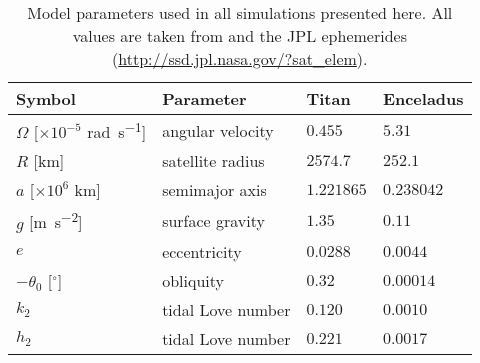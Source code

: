 \begin{table}[!t]
\scriptsize
\centering
\begin{tabularx}{0.51\linewidth}{p{1.8cm} p{2cm} p{1cm} p{1.2cm}}
 \toprule
Symbol & Parameter & Titan & Enceladus\\
 \midrule \midrule
$\Omega$ [$\times 10^{-5}$ \si{\radian\per\second}]	& angular velocity 		& $0.455$ & $5.31 $ \\
$R$ [\si{\kilo\metre}]				& satellite radius 		& $2574.7$ & $252.1$\\
$a$ [$\times 10^6$ \si{\kilo\metre}]				& semimajor axis 		& $1.221865$ & $0.238042$\\
$g$ [\si{\metre\per\second\squared}]		& surface gravity 		& $1.35$ & $0.11$\\
$e$ 								& eccentricity 			& $0.0288$ & $0.0044$\\
$-\theta_0$ [$^{\circ}$] 			& obliquity 			& $0.32$ & $0.00014$\\
$k_2$ 								& tidal Love number 	& $0.120$ & $0.0010$\\
$h_2$ 								& tidal Love number 	& $0.221$ & $0.0017$\\
 \bottomrule
\end{tabularx}
\caption{Model parameters used in all simulations presented here. All values are taken from \citet{zebker2009size,chen2013tidal,matsuyama2014tidal} and the JPL ephemerides (\url{http://ssd.jpl.nasa.gov/?sat_elem}).  \label{tb:param}}
\end{table}